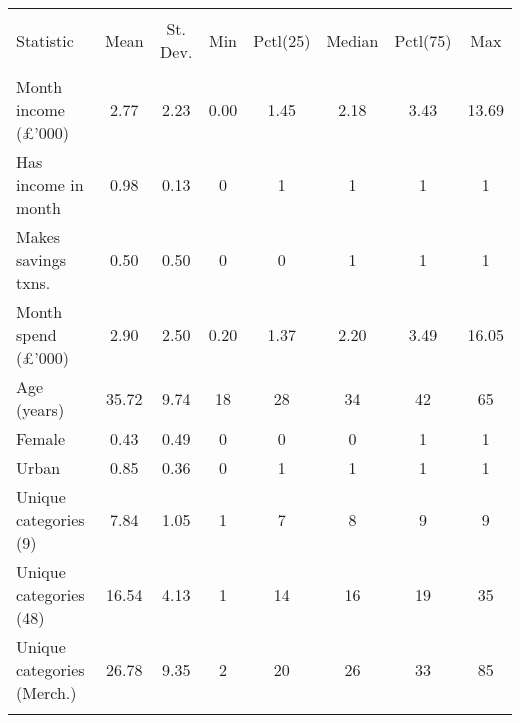 
\begin{tabular}{@{\extracolsep{5pt}}lccccccc} 
\\[-1.8ex]\hline 
\hline \\[-1.8ex] 
Statistic & \multicolumn{1}{c}{Mean} & \multicolumn{1}{c}{St. Dev.} & \multicolumn{1}{c}{Min} & \multicolumn{1}{c}{Pctl(25)} & \multicolumn{1}{c}{Median} & \multicolumn{1}{c}{Pctl(75)} & \multicolumn{1}{c}{Max} \\ 
\hline \\[-1.8ex] 
Month income (\pounds'000) & 2.77 & 2.23 & 0.00 & 1.45 & 2.18 & 3.43 & 13.69 \\ 
Has income in month & 0.98 & 0.13 & 0 & 1 & 1 & 1 & 1 \\ 
Makes savings txns. & 0.50 & 0.50 & 0 & 0 & 1 & 1 & 1 \\ 
Month spend (\pounds'000) & 2.90 & 2.50 & 0.20 & 1.37 & 2.20 & 3.49 & 16.05 \\ 
Age (years) & 35.72 & 9.74 & 18 & 28 & 34 & 42 & 65 \\ 
Female & 0.43 & 0.49 & 0 & 0 & 0 & 1 & 1 \\ 
Urban & 0.85 & 0.36 & 0 & 1 & 1 & 1 & 1 \\ 
Unique categories (9) & 7.84 & 1.05 & 1 & 7 & 8 & 9 & 9 \\ 
Unique categories (48) & 16.54 & 4.13 & 1 & 14 & 16 & 19 & 35 \\ 
Unique categories (Merch.) & 26.78 & 9.35 & 2 & 20 & 26 & 33 & 85 \\ 
\hline \\[-1.8ex] 
\end{tabular} 
